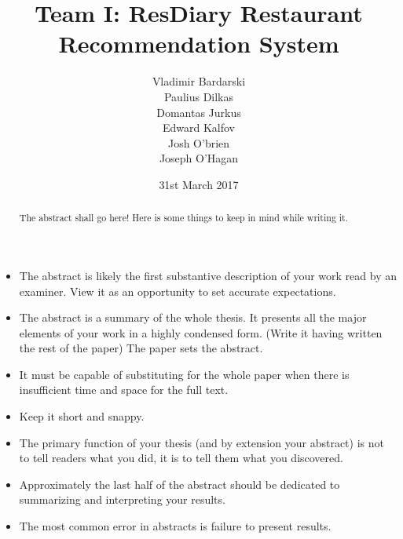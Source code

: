 \documentclass{l3proj}
\begin{document}
\title{Team I: ResDiary Restaurant Recommendation System}

\author{Vladimir Bardarski \\
        Paulius Dilkas \\
        Domantas Jurkus \\
        Edward Kalfov \\
        Josh O'brien \\
		Joseph O'Hagan}

\date{31st March 2017}

\maketitle

\begin{abstract}
The abstract shall go here! Here is some things to keep in mind while writing it.
\end{abstract}

\begin{itemize}
\item The abstract is likely the first substantive description of your work read by an examiner. View it as an opportunity to set accurate expectations.
\item The abstract is a summary of the whole thesis. It presents all the major elements of your work in a highly condensed form. (Write it having written the rest of the paper) The paper sets the abstract.
\item It must be capable of substituting for the whole paper when there is insufficient time and space for the full text.
\item Keep it short and snappy. 
\item The primary function of your thesis (and by extension your abstract) is not to tell readers what you did, it is to tell them what you discovered.
\item Approximately the last half of the abstract should be dedicated to summarizing and interpreting your results.
\item The most common error in abstracts is failure to present results.
\end{itemize}

\educationalconsent
\newpage
\end{document}
